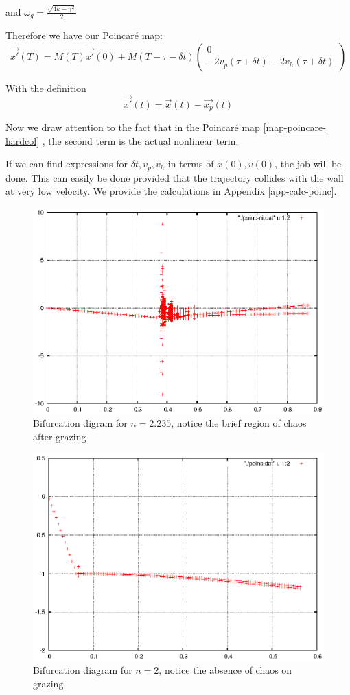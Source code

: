 \documentclass[oneside]{book}
\renewcommand{\(}{\begin{columns}}
\renewcommand{\)}{\end{columns}}
\newcommand{\<}[1]{\begin{column}{#1}}
\renewcommand{\>}{\end{column}}
\newcommand{\colv}[2]{\begin{pmatrix}#1\\#2\end{pmatrix}}
\begin{document}
and
$\omega_g=\frac{\sqrt{4k-\gamma^2}}{2}$
 
Therefore we have our Poincaré map:
\begin{equation}
\label{map-poincare-hardcol}
\vec{x'}(T)=M(T)\vec{x'}(0)+M(T-\tau-\delta t)\colv{0}{-2v_p(\tau+\delta t)-2v_h(\tau+\delta t)}
\end{equation}

With the definition
\[
\vec{x'}(t)=\vec{x}(t)-\vec{x_p}(t)
\]

Now we draw attention to the fact that in the Poincaré map 
\eqref{map-poincare-hardcol} , the second term is the actual nonlinear term.  

If we can find expressions for $\delta t, v_p, v_h$ in terms of $x(0),v(0)$, 
the job will be done.  This can easily be done provided that the trajectory 
collides with the wall at very low velocity.  We provide the calculations in 
Appendix \ref{app-calc-poinc}.
 


\begin{figure}[!htp]
\begin{center}
\caption{Bifurcation digram for $n=2.235$, notice the brief region of chaos after grazing}
\label{fig-bif-int}
\includegraphics[width=0.6\columnwidth]{after-graz-non-int}
\end{center}
\end{figure}

\begin{figure}[!htb]
\begin{center}
\caption{Bifurcation diagram for $n=2$, notice the absence of chaos on grazing}
\label{fig-bif-nonint}
\includegraphics[width=0.6\columnwidth]{after-graz-int}
\end{center}
\end{figure}
\end{document}
